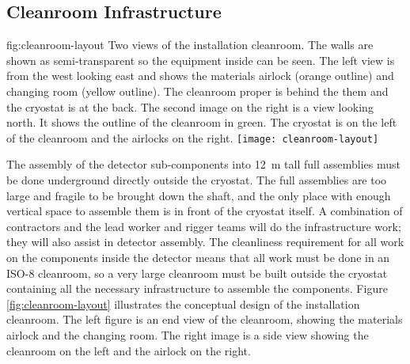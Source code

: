\subsection{Cleanroom Infrastructure}
\label{sec:fdsp-tc-infr-comm}

\begin{dunefigure}{fig:cleanroom-layout}
  {Two views of the installation cleanroom. The walls are shown as semi-transparent so the equipment inside can be seen. The left view is from the west looking east and shows the materials airlock (orange outline) and changing room (yellow outline). The cleanroom proper is behind the them and the cryostat is at the back. The second image on the right is a view looking north. It shows the outline of the cleanroom in green. The cryostat is on the left of the cleanroom and the airlocks on the right.} 
\texttt{[image: cleanroom-layout]}
\end{dunefigure}

The assembly of the detector sub-components into \SI{12}{m} tall full assemblies %
must be done underground directly outside the cryostat. The full %
assemblies are too large and fragile to be brought down the shaft, and the only place with enough vertical space to assemble them is in front of the cryostat itself. A combination of contractors and the lead worker and rigger teams will do the infrastructure work; they will also assist in detector assembly. The cleanliness requirement for all work on the components inside the detector means that all work must be done in an ISO-8 cleanroom, so a very large cleanroom must be built outside the cryostat containing all the necessary infrastructure to assemble the %
 components. Figure \ref{fig:cleanroom-layout} illustrates %
the conceptual design of the installation cleanroom. The left figure is an end view of the cleanroom, showing the materials airlock 
and the changing room. The right image is a side view showing the cleanroom on the left and the airlock on the right.

